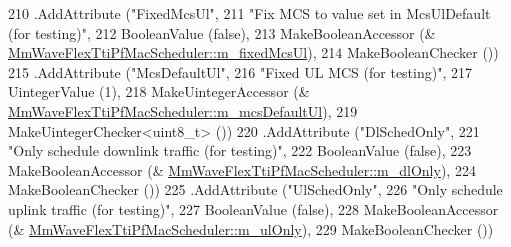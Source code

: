 \begin{DoxyCode}
210          .AddAttribute (\textcolor{stringliteral}{"FixedMcsUl"},
211                                                                         \textcolor{stringliteral}{"Fix MCS to value set in
       McsUlDefault (for testing)"},
212                                                                         BooleanValue (\textcolor{keyword}{false}),
213                                                                         MakeBooleanAccessor (&
      \hyperlink{classns3_1_1MmWaveFlexTtiPfMacScheduler_a44841cc06dfeca9a33cd8e2ad831c3a0}{MmWaveFlexTtiPfMacScheduler::m\_fixedMcsUl}),
214                                                                         MakeBooleanChecker ())
215         .AddAttribute (\textcolor{stringliteral}{"McsDefaultUl"},
216                                                                  \textcolor{stringliteral}{"Fixed UL MCS (for testing)"},
217                                                                  UintegerValue (1),
218                                                                  MakeUintegerAccessor (&
      \hyperlink{classns3_1_1MmWaveFlexTtiPfMacScheduler_a6ddeee7628a4f68bbe0ab7b5d5bc72b8}{MmWaveFlexTtiPfMacScheduler::m\_mcsDefaultUl}),
219                                                                  MakeUintegerChecker<uint8\_t> ())
220          .AddAttribute (\textcolor{stringliteral}{"DlSchedOnly"},
221                                                                         \textcolor{stringliteral}{"Only schedule downlink traffic
       (for testing)"},
222                                                                         BooleanValue (\textcolor{keyword}{false}),
223                                                                         MakeBooleanAccessor (&
      \hyperlink{classns3_1_1MmWaveFlexTtiPfMacScheduler_ab0f6fd985da313250889b03804ba3752}{MmWaveFlexTtiPfMacScheduler::m\_dlOnly}),
224                                                                         MakeBooleanChecker ())
225          .AddAttribute (\textcolor{stringliteral}{"UlSchedOnly"},
226                                                                         \textcolor{stringliteral}{"Only schedule uplink traffic (for
       testing)"},
227                                                                         BooleanValue (\textcolor{keyword}{false}),
228                                                                         MakeBooleanAccessor (&
      \hyperlink{classns3_1_1MmWaveFlexTtiPfMacScheduler_ae45916409f6aa294dc424f2fc3879a5d}{MmWaveFlexTtiPfMacScheduler::m\_ulOnly}),
229                                                                         MakeBooleanChecker ())

\end{DoxyCode}
